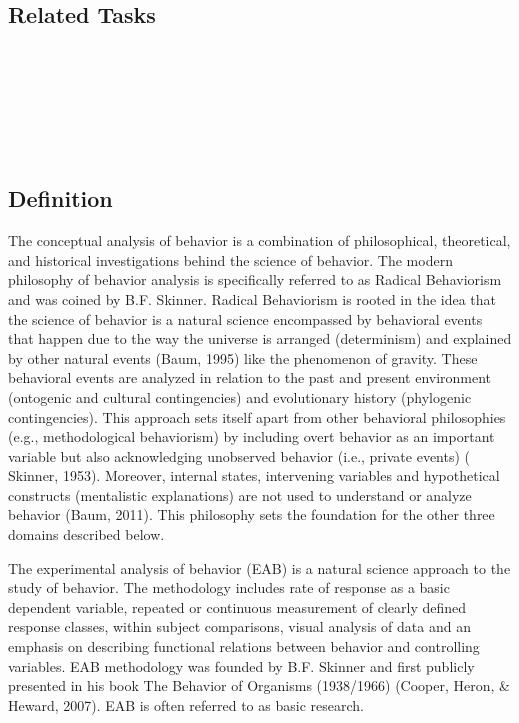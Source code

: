 \subsection{Related Tasks}
\fourbOne{}\\
\fourgFour{}\\
\fourgFive{}\\
\fourFKOne{}\\
\fourFKSeven{}\\
%
%
%
%
%
%
%
\section[\fourFKNine{}]{\fourFKNine{}%
              }
\subsection{Definition}
The conceptual analysis of behavior is a combination of philosophical, theoretical, and historical investigations behind the science of behavior.  The modern philosophy of behavior analysis is specifically referred to as Radical Behaviorism and was coined by B.F. Skinner. Radical Behaviorism is rooted in the idea that the science of behavior is a natural science encompassed by behavioral events that happen due to the way the universe is arranged (determinism) and explained by other natural events (Baum, 1995) like the phenomenon of gravity. These behavioral events are analyzed in relation to the past and present environment (ontogenic and cultural contingencies) and evolutionary history (phylogenic contingencies). This approach sets itself apart from other behavioral philosophies (e.g., methodological behaviorism) by including overt behavior as an important variable but also acknowledging unobserved behavior (i.e., private events) ( Skinner, 1953). Moreover, internal states, intervening variables and hypothetical constructs (mentalistic explanations) are not used to understand or analyze behavior (Baum, 2011). This philosophy sets the foundation for the other three domains described below.  

The experimental analysis of behavior (EAB) is a natural science approach to the study of behavior.  The methodology includes rate of response as a basic dependent variable, repeated or continuous measurement of clearly defined response classes, within subject comparisons, visual analysis of data and an emphasis on describing functional relations between behavior and controlling variables. EAB methodology was founded by B.F. Skinner and first publicly presented in his book The Behavior of Organisms (1938/1966) (Cooper, Heron, \& Heward, 2007). EAB is often referred to as basic research. 


